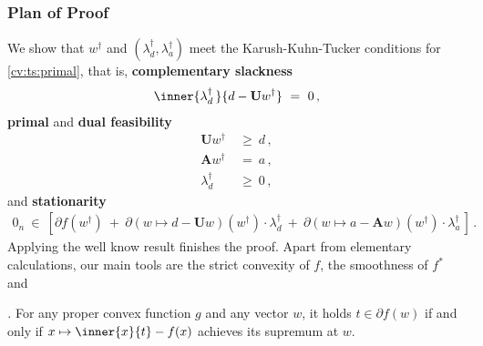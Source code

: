 \subsubsection*{Plan of Proof}
We show that 
$w^\dagger$ and 
$
(\lambda_d^\dagger,\lambda_a^\dagger)
$
meet the 
Karush-Kuhn-Tucker conditions for \ref{cv:ts:primal},
that is,
\textbf{complementary slackness}
\begin{gather}
  \label{cv:ts:comps}
\inner
{\lambda_d^\dagger\,}{d-\mathbf{U} w^\dagger}
\ 
=
\ 
0
\,,
\end{gather}
\textbf{primal} and \textbf{dual feasibility}
\begin{align}
  \label{cv:ts:pfea}
    \mathbf{U}w^\dagger
    &
    \ 
    \ge
    \ 
    d
    \,,
    \\
    \nonumber
    \mathbf{A}w^\dagger
    &
    \ 
    =
    \ 
    a
    \,,
  \\
  \label{cv:ts:dfea}
  \lambda_d^\dagger
    &
    \ 
  \ge
  \ 
  0
    \,,
\end{align}
and 
\textbf{stationarity}
\begin{gather}
  \label{cv:ts:st}
  \mathrm{0}_n
  \ 
  \in
  \ 
  [
  \partial
  f(w^\dagger)
  \ 
  +
  \ 
    \partial
    \left( 
      w
      \mapsto
      d
      -
      \mathbf{U}w
    \right)
    (w^\dagger)
    \cdot
    \lambda_d^\dagger
    \ 
    +
    \ 
    \partial
    \left( 
      w
      \mapsto
      a
      -
      \mathbf{A}w
    \right)
    (w^\dagger)
    \cdot
    \lambda_a^\dagger
    \,
  ]
  \,.
\end{gather}
Applying the well know result\cite[Theorem~28.3]{Rockafellar1970}
finishes the proof.
Apart from elementary calculations, our main tools are the 
strict convexity of $f$, the smoothness of $f^*$ and 
\begin{proposition}
  \emph{
\cite[Theorem~23.5(a)-(b)]{Rockafellar1970}.
  }
  \label{cv:ts:prop}
   For any proper convex function $g$ and any vector $w$, 
   it holds $t\in \partial f(w)$ 
   if and only if 
   $
   x
   \mapsto
   \inner
   {x}{t}
   -
   f(x)
   $
   achieves its supremum at $w$.
\end{proposition}

